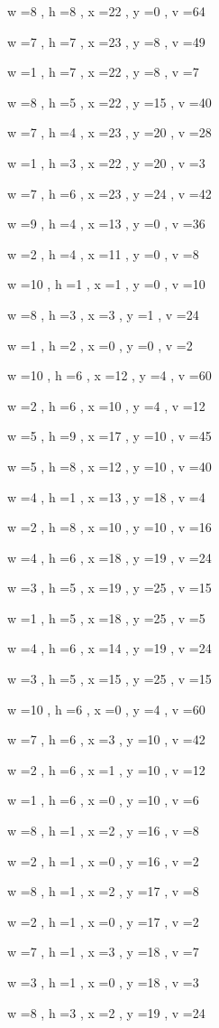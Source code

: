 \documentclass[11pt]{article}
\begin{document}
w =8 , h =8 , x =22 , y =0 , v =64
\par
w =7 , h =7 , x =23 , y =8 , v =49
\par
w =1 , h =7 , x =22 , y =8 , v =7
\par
w =8 , h =5 , x =22 , y =15 , v =40
\par
w =7 , h =4 , x =23 , y =20 , v =28
\par
w =1 , h =3 , x =22 , y =20 , v =3
\par
w =7 , h =6 , x =23 , y =24 , v =42
\par
w =9 , h =4 , x =13 , y =0 , v =36
\par
w =2 , h =4 , x =11 , y =0 , v =8
\par
w =10 , h =1 , x =1 , y =0 , v =10
\par
w =8 , h =3 , x =3 , y =1 , v =24
\par
w =1 , h =2 , x =0 , y =0 , v =2
\par
w =10 , h =6 , x =12 , y =4 , v =60
\par
w =2 , h =6 , x =10 , y =4 , v =12
\par
w =5 , h =9 , x =17 , y =10 , v =45
\par
w =5 , h =8 , x =12 , y =10 , v =40
\par
w =4 , h =1 , x =13 , y =18 , v =4
\par
w =2 , h =8 , x =10 , y =10 , v =16
\par
w =4 , h =6 , x =18 , y =19 , v =24
\par
w =3 , h =5 , x =19 , y =25 , v =15
\par
w =1 , h =5 , x =18 , y =25 , v =5
\par
w =4 , h =6 , x =14 , y =19 , v =24
\par
w =3 , h =5 , x =15 , y =25 , v =15
\par
w =10 , h =6 , x =0 , y =4 , v =60
\par
w =7 , h =6 , x =3 , y =10 , v =42
\par
w =2 , h =6 , x =1 , y =10 , v =12
\par
w =1 , h =6 , x =0 , y =10 , v =6
\par
w =8 , h =1 , x =2 , y =16 , v =8
\par
w =2 , h =1 , x =0 , y =16 , v =2
\par
w =8 , h =1 , x =2 , y =17 , v =8
\par
w =2 , h =1 , x =0 , y =17 , v =2
\par
w =7 , h =1 , x =3 , y =18 , v =7
\par
w =3 , h =1 , x =0 , y =18 , v =3
\par
w =8 , h =3 , x =2 , y =19 , v =24
\par
\newpage
\end{document}
